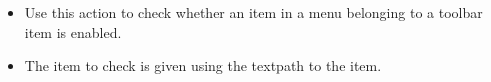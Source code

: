 
\begin{itemize}
\item Use this action to check whether an item in a menu belonging to a toolbar item is enabled.
\item The item to check is given using the textpath to the item. 
\end{itemize}
